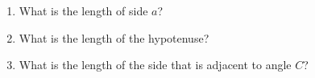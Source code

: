 \documentclass{article}
\begin{document}
\begin{enumerate}
\item What is the length of side $a$?

        \begin{enumerate}
        \end{enumerate}

\item What is the length of the hypotenuse?

        \begin{enumerate}
        \end{enumerate}

\item What is the length of the side that is adjacent to angle $C$?

        \begin{enumerate}
        \end{enumerate}
 
\end{enumerate}
\end{document}
